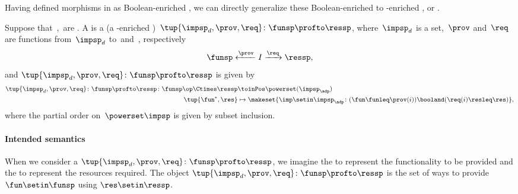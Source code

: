 Having defined morphisms in \DP as Boolean-enriched , we can directly generalize these Boolean-enriched  to \Set-enriched , or .
\begin{widepar}
    \begin{definition}
        \label{def:dpwithimp}
        Suppose that~\funsp,~\ressp are .
        A \emph{} is a  (a \Set-enriched )~$\tup{\impsp_d,\prov,\req}\colon \funsp\profto \ressp$, where~$\impsp_d$ is a set,~$\prov$ and~$\req$ are functions from~$\impsp_d$ to~\funsp and~\ressp, respectively
        \begin{equation}
            \funsp \xleftarrow{\prov} I \xrightarrow{\req} \ressp,
        \end{equation}
        and $\tup{\impsp_d,\prov,\req}\colon \funsp\profto \ressp$ is given by
        \begin{equation}
            \begin{aligned}
                \tup{\impsp_d,\prov,\req}\colon \funsp\profto \ressp \colon \funsp\op \Ctimes \ressp & \toinPos \powerset(\impsp_\adp) \\
                \tup{\fun^*, \res}                                                                   & \mapsto \makeset{ \imp \setin \impsp_\adp \colon ( \fun \funleq \prov(i)) \booland (\req(i) \resleq \res) },
            \end{aligned}
        \end{equation}
        where the partial order on~$\powerset\impsp$ is given by subset inclusion.
    \end{definition}
\end{widepar}

\paragraph{Intended semantics}
When we consider a  $\tup{\impsp_d, \prov, \req}\colon \funsp\profto \ressp$, we imagine the  \funsp to represent the functionality to be provided and the  \ressp to represent the resources required.
The object $\tup{\impsp_d,\prov,\req}\colon \funsp\profto \ressp$ is the set of ways to provide $\fun\setin \funsp$ using $\res\setin \ressp$.

